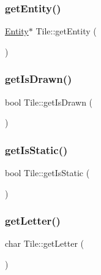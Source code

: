 \mbox{\label{class_tile_a2cedc53ffae2370ae1c7f7df2c8c9933}} 
\subsubsection{\texorpdfstring{get\+Entity()}{getEntity()}}
{\footnotesize\ttfamily \hyperlink{class_entity}{Entity}$\ast$ Tile\+::get\+Entity (\begin{DoxyParamCaption}{ }\end{DoxyParamCaption})\hspace{0.3cm}{\ttfamily [inline]}}

\mbox{\label{class_tile_a6f49ff69c5a2f97b8432b2febb0eec9a}} 
\subsubsection{\texorpdfstring{get\+Is\+Drawn()}{getIsDrawn()}}
{\footnotesize\ttfamily bool Tile\+::get\+Is\+Drawn (\begin{DoxyParamCaption}{ }\end{DoxyParamCaption})\hspace{0.3cm}{\ttfamily [inline]}}

\mbox{\label{class_tile_a0f907344cbf2e058545597949effad02}} 
\subsubsection{\texorpdfstring{get\+Is\+Static()}{getIsStatic()}}
{\footnotesize\ttfamily bool Tile\+::get\+Is\+Static (\begin{DoxyParamCaption}{ }\end{DoxyParamCaption})\hspace{0.3cm}{\ttfamily [inline]}}

\mbox{\label{class_tile_afc218c65412cc6c2065d12655a50bb91}} 
\subsubsection{\texorpdfstring{get\+Letter()}{getLetter()}}
{\footnotesize\ttfamily char Tile\+::get\+Letter (\begin{DoxyParamCaption}{ }\end{DoxyParamCaption})\hspace{0.3cm}{\ttfamily [inline]}}

